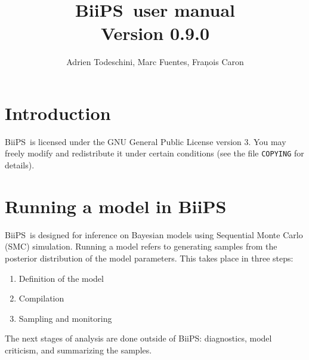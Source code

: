 \documentclass[11pt, a4paper, titlepage]{report}
\newcommand{\biips}{\textsf{BiiPS}}
\newcommand{\release}{0.9.0}
\newcommand{\JAGS}{\textsf{JAGS}}
\newcommand{\rjags}{\textsf{rjags}}
\newcommand{\OpenBUGS}{\textsf{OpenBUGS}}
\newcommand{\R}{\textsf{R}}
\newcommand{\CODA}{\textsf{coda}}
\begin{document}
\title{\biips\ user manual\\Version \release}
\author{Adrien Todeschini, Marc Fuentes, Fran\c{}ois Caron}

\maketitle

\tableofcontents

\chapter{Introduction}

% 

\biips\ is licensed under the GNU General Public License
version 3. You may freely modify and redistribute it under certain
conditions (see the file \texttt{COPYING} for details).

\chapter{Running a model in \biips}

\biips\ is designed for inference on Bayesian models using Sequential
Monte Carlo (SMC) simulation.  Running a model refers to generating
samples from the posterior distribution of the model parameters.  This
takes place in three steps:
\begin{enumerate}
\item Definition of the model
\item Compilation
\item Sampling and monitoring
\end{enumerate}
The next stages of analysis are done outside of \biips: diagnostics,
model criticism, and summarizing the samples.
\end{document}
